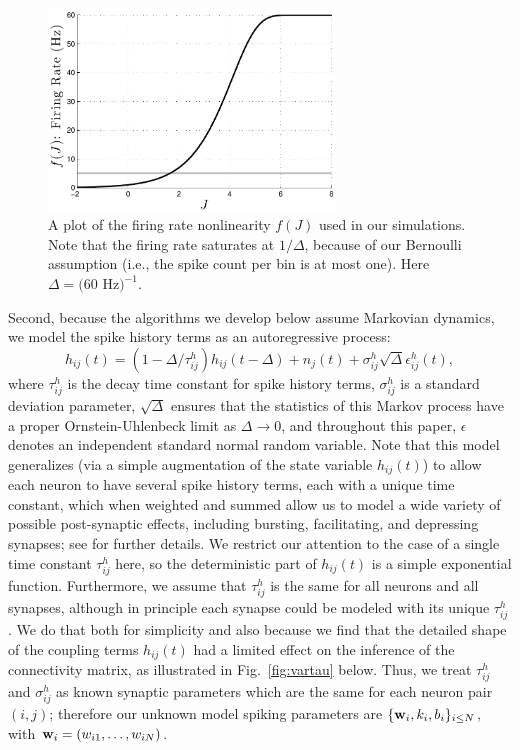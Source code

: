 \begin{figure}[t!]
\centering \includegraphics[width=3in]{../figs/fr_vs_J}
\caption{A plot of the firing rate nonlinearity $f(J)$ used in our
  simulations.  Note that the firing
  rate saturates at $1/\Delta$, because of our Bernoulli assumption
  (i.e., the spike count per bin is at most one). Here $\Delta = (60$
  Hz$)^{-1}$.}
\label{fig:egfluor}
\end{figure}

Second, because the algorithms we develop below assume Markovian dynamics, we model the spike history terms as an autoregressive process:
\begin{equation} \label{eqn:h:definition}
h_{ij}(t) = (1- \Delta/\tau^h_{ij}) h_{ij}(t- \Delta) +n_j(t) + \sigma^h_{ij}
  \sqrt{\Delta} \epsilon^h_{ij}(t),
\end{equation}
where $\tau^h_{ij}$ is the decay time constant for spike history terms, $\sigma^h_{ij}$ is a standard deviation parameter, $\sqrt{\Delta}$ ensures that the statistics of this Markov process have a proper Ornstein-Uhlenbeck limit as $\Delta \to 0$, and throughout this paper, $\epsilon$ denotes an independent standard normal random variable. Note that this model generalizes (via a simple augmentation of the state variable $h_{ij}(t)$) to allow each neuron to have several spike history terms, each with a unique time constant, which when weighted and summed allow us to model a wide variety of possible post-synaptic effects, including bursting, facilitating, and depressing synapses; see \cite{Vogelstein2009} for further details. We restrict our attention to the case of a single time constant $\tau^h_{ij}$ here, so the deterministic part of $h_{ij}(t)$ is a simple exponential function. Furthermore, we assume that $\tau^h_{ij}$ is the same for all neurons and all synapses, although in principle each synapse could be modeled with its unique $\tau^h_{ij}$. We do that both for simplicity and also because we find that the detailed shape of the coupling terms $h_{ij}(t)$ had a limited effect on the inference of the connectivity matrix, as illustrated in Fig.~\ref{fig:vartau} below. Thus, we treat $\tau^h_{ij}$ and $\sigma^h_{ij}$ as known synaptic parameters which are the same for each neuron pair $(i,j)$; therefore our unknown model spiking parameters are $\{\mathbf{w}_i,k_i,b_i\}_{i\leq N}$, with $\mathbf{w}_i=(w_{i1},\ldots, w_{iN})$.

